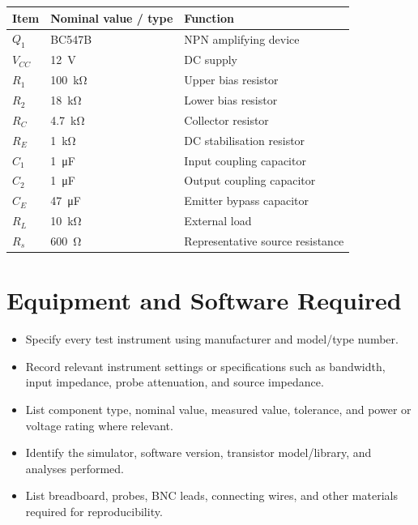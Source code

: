 \documentclass[11pt,a4paper]{article}
\begin{document}
\begin{examplebox}
\begin{center}
\begin{tabular}{lll}
\toprule
Item & Nominal value / type & Function \\
\midrule
$Q_1$ & BC547B & NPN amplifying device \\
$V_{CC}$ & \SI{12}{\volt} & DC supply \\
$R_1$ & \SI{100}{\kilo\ohm} & Upper bias resistor \\
$R_2$ & \SI{18}{\kilo\ohm} & Lower bias resistor \\
$R_C$ & \SI{4.7}{\kilo\ohm} & Collector resistor \\
$R_E$ & \SI{1}{\kilo\ohm} & DC stabilisation resistor \\
$C_1$ & \SI{1}{\micro\farad} & Input coupling capacitor \\
$C_2$ & \SI{1}{\micro\farad} & Output coupling capacitor \\
$C_E$ & \SI{47}{\micro\farad} & Emitter bypass capacitor \\
$R_L$ & \SI{10}{\kilo\ohm} & External load \\
$R_s$ & \SI{600}{\ohm} & Representative source resistance \\
\bottomrule
\end{tabular}
\end{center}
\end{examplebox}

\section{Equipment and Software Required}
\begin{sectionguide}
\begin{itemize}
  \item Specify every test instrument using manufacturer and model/type number.
  \item Record relevant instrument settings or specifications such as
        bandwidth, input impedance, probe attenuation, and source impedance.
  \item List component type, nominal value, measured value, tolerance, and
        power or voltage rating where relevant.
  \item Identify the simulator, software version, transistor model/library,
        and analyses performed.
  \item List breadboard, probes, BNC leads, connecting wires, and other
        materials required for reproducibility.
\end{itemize}
\end{sectionguide}
\end{document}
